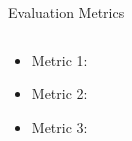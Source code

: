 \begin{frame}{Evaluation Metrics}

\begin{columns}[T,onlytextwidth]
\centering
{}

\centering
{}

\centering
{}
\end{columns}

\vspace{0.60cm}

\begin{itemize}
    \item Metric 1: 
    \item Metric 2: 
    \item Metric 3: 
\end{itemize}

\end{frame}
